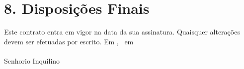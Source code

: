 \section*{8. Disposições Finais}
Este contrato entra em vigor na data da sua assinatura. Quaisquer alterações devem ser efetuadas por escrito.
\vspace{2cm}
Em \ContractPlace, \ em \ContractDate \hfill \underline{\hspace{5cm}} \\ \vspace{1.5cm}
\underline{\hspace{5cm}} \hfill \underline{\hspace{5cm}} \\ \vspace{0.2cm} Senhorio \hfill Inquilino \\
